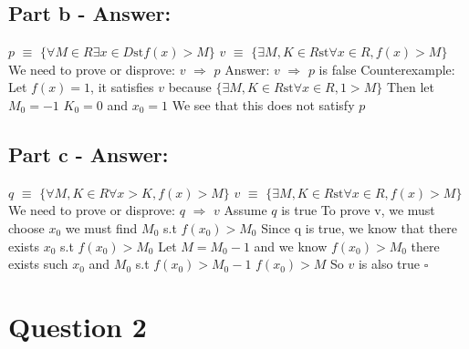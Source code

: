 \documentclass[12pt]{article}
\begin{document}
\subsection*{Part b - Answer:}
{
$p$ $\equiv$ $\{\forall M \in R \exists x \in D \text{st} f(x)>M\}$\newline
 \newline
$v$ $\equiv$ $\{\exists M,K \in R \text{st} \forall x \in R,f(x)>M\}$\newline
 \newline
We need to prove or disprove: $v$ $\Rightarrow$ $p$\newline
Answer: $v$ $\Rightarrow$ $p$ is false\newline
Counterexample: Let $f(x)= 1$, it satisfies $v$\newline
because $\{\exists M,K \in R \text{st} \forall x \in R,1>M\}$\newline
Then let $M_{0}=-1$ $K_{0}=0$ and $x_{0}=1$\newline
We see that this does not satisfy $p$
}
\subsection*{Part c - Answer:}
{
$q$ $\equiv$ $\{\forall M,K \in R \forall x>K,f(x)>M\}$\newline
 \newline
$v$ $\equiv$ $\{\exists M,K \in R \text{st} \forall x \in R,f(x)>M\}$\newline
We need to prove or disprove: $q$ $\Rightarrow$ $v$\newline
Assume $q$ is true\newline
To prove v, we must choose $x_{0}$ we must find $M_{0}$ s.t $f(x_{0})>M_{0}$\newline
Since q is true, we know that there exists $x_{0}$ s.t $f(x_{0})>M_{0}$\newline
Let $M=M_{0}-1$ and we know $f(x_{0})>M_{0}$\newline
there exists such $x_{0}$ and $M_{0}$\newline
s.t $f(x_{0})>M_{0}-1$\newline
$f(x_{0})>M$
So $v$ is also true $\square$
}
\newpage
\section*{Question 2}
\end{document}
